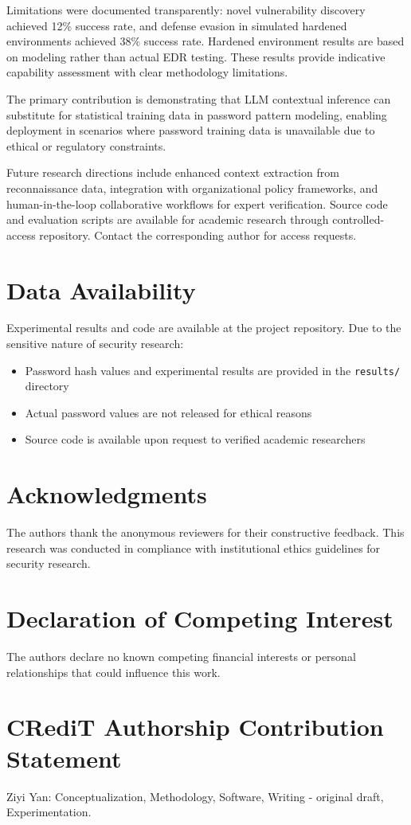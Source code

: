 \documentclass[preprint,12pt]{elsarticle}
\begin{document}
Limitations were documented transparently: novel vulnerability discovery achieved 12\% success rate, and defense evasion in simulated hardened environments achieved 38\% success rate. Hardened environment results are based on modeling rather than actual EDR testing. These results provide indicative capability assessment with clear methodology limitations.

The primary contribution is demonstrating that LLM contextual inference can substitute for statistical training data in password pattern modeling, enabling deployment in scenarios where password training data is unavailable due to ethical or regulatory constraints.

Future research directions include enhanced context extraction from reconnaissance data, integration with organizational policy frameworks, and human-in-the-loop collaborative workflows for expert verification. Source code and evaluation scripts are available for academic research through controlled-access repository. Contact the corresponding author for access requests.

\section*{Data Availability}

Experimental results and code are available at the project repository. Due to the sensitive nature of security research:
\begin{itemize}
    \item Password hash values and experimental results are provided in the \texttt{results/} directory
    \item Actual password values are not released for ethical reasons
    \item Source code is available upon request to verified academic researchers
\end{itemize}

\section*{Acknowledgments}

The authors thank the anonymous reviewers for their constructive feedback. This research was conducted in compliance with institutional ethics guidelines for security research.

\section*{Declaration of Competing Interest}

The authors declare no known competing financial interests or personal relationships that could influence this work.

\section*{CRediT Authorship Contribution Statement}

Ziyi Yan: Conceptualization, Methodology, Software, Writing - original draft, Experimentation.


\end{document}
